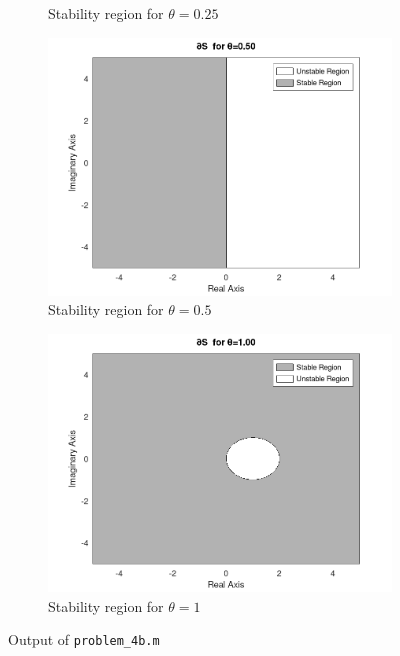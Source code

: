 \begin{solution}
\begin{figure}[h]
\begin{subfigure}{0.45\textwidth}
            \caption{Stability region for $\theta = 0.25$}
        \end{subfigure}
        \begin{subfigure}{0.45\textwidth}
            \includegraphics*[width=\textwidth]{problem_4b_t_0.50.png}
            \caption{Stability region for $\theta = 0.5$}
        \end{subfigure}
        \hfill
        \begin{subfigure}{0.45\textwidth}
            \includegraphics*[width=\textwidth]{problem_4b_t_1.00.png}
            \caption{Stability region for $\theta = 1$}
        \end{subfigure}
        \caption{Output of \texttt{problem\_4b.m}}
    \end{figure}
\end{solution}